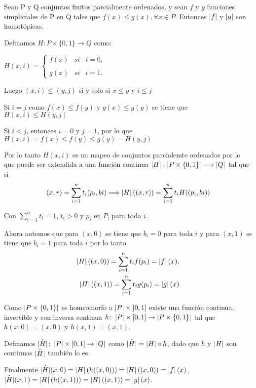 \begin{Teo}
Sean P y Q conjuntos finitos parcialmente ordenados, y sean $f$ y $g$ funciones simpliciales de P en Q tales que $f(x)\leq g(x), \forall x\in P$. Entonces $\left| f \right|$ y $\left| g \right|$ son homotópicas.
\end{Teo}
\begin{Dem}

Definamos $H\colon P\times \{ 0,1\} \rightarrow Q$ como:

$H(x,i)= \left\{ \begin{array}{lcc}
              f(x)&   si &i=0,  \\
             \\ g(x) &  si& i=1. 
             \end{array}
    \right. $

Luego $(x,i) \leq (y,j)$ si y solo si $x\leq y$ y $i\leq j$

Si $i=j$ como $f(x)\leq f(y)$ y $g(x)\leq g(y)$ se tiene que $H(x,i)\leq H(y,j)$

Si $i<j$, entonces $i = 0$ y $j = 1$, por lo que
$H(x,i) = f(x)\leq f(y)\leq g(y) = H(y,j)$

Por lo tanto $H(x,i)$ es un mapeo de conjuntos parcialemte ordenados por lo que puede ser extendida a una función continua $\left| H \right|:\left| P\times \{ 0,1\} \right| \longrightarrow \left| Q \right|$ tal que si
\[
(x,r) =\sum_{i=1}^{n}t_{i}(p_{i},b{i}) \Longrightarrow \left| H \right|((x,r))= \sum_{i=1}^{n}t_{i}H((p_{i},b{i}))
\]

Con $\sum_{i=1}^{n}t_{i}=1$, $t_{i}>0$ y $p_{i}$ en $P$, para toda $i$.

Ahora notemos que para $(x,0)$ se tiene que  $b_{i}=0$ para toda $i$ y para $(x,1)$ se tiene que $ b_{i} = 1$ para toda $i$ por lo tanto
\begin{eqnarray}
\left| H \right|((x,0)) =\sum_{i=1}^{n}t_{i}f(p_{i}) = \left| f \right|(x),\\
\left| H \right|((x,1)) =\sum_{i=1}^{n}t_{i}g(p_{i}) = \left| g \right|(x)
\end{eqnarray}

Como $\left| P\times\{0,1\} \right|$ es homeomorfo a $\left| P \right|\times[0,1]$ existe una función continua, invertible y con inversa continua $h\colon\left| P \right|\times[0,1]\rightarrow \left| P\times\{0,1\} \right|$ tal que $h(x,0) = (x,0)$ y $h(x,1) = (x,1)$.

Definamos $\hat{\left| H \right|}\colon\left| P \right|\times[0,1]\to \left| Q \right|$ como $\hat{\left| H \right|} =  \left| H \right| \circ h$, dado que $h$ y $\left| H \right|$ son continuas $\hat{\left| H \right|}$ también lo es.

Finalmente 
$\hat{\left| H \right|}(x,0)= \left| H \right|(h((x,0)))=\left| H \right|((x,0)) = \left| f \right|(x)$,
$\hat{\left| H \right|}(x,1)= \left| H \right|(h((x,1)))=\left| H \right|((x,1)) = \left| g \right|(x)$.
\end{Dem}

